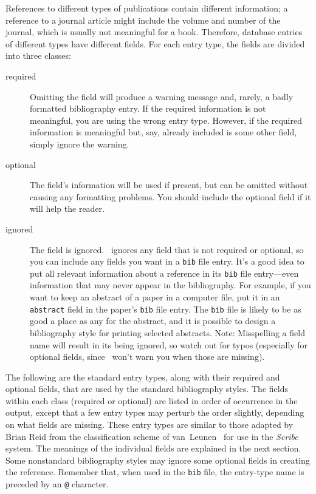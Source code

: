 References to different types of publications contain different
information; a reference to a journal article might include the volume
and number of the journal, which is usually not meaningful for a book.
Therefore, database entries of different types have different fields.
For each entry type, the fields are divided into three classes:
\begin{description}

\item[required]
Omitting the field will produce a warning message
and, rarely, a badly formatted bibliography entry.
If the required information is not meaningful,
you are using the wrong entry type.
However, if the required information is meaningful
but, say, already included is some other field,
simply ignore the warning.

\item[optional]
The field's information will be used if present,
but can be omitted without causing any formatting problems.
You should include the optional field if it will help the reader.

\item[ignored]
The field is ignored.
\BibTeX\ ignores any field that is not required or optional, so you can include
any fields you want in a \hbox{\tt bib} file entry.  It's a good idea
to put all relevant information about
a reference in its \hbox{\tt bib} file entry---even information that
may never appear in the bibliography.  For example, if you want to
keep an abstract of a paper in a computer file, put it in an \hbox{\tt
abstract} field in the paper's \hbox{\tt bib} file entry.  The
\hbox{\tt bib} file is likely to be as good a place as any for the
abstract, and it is possible to design a bibliography style for
printing selected abstracts.
Note: Misspelling a field name will
result in its being ignored,
so watch out for typos
(especially for optional fields,
since \BibTeX\ won't warn you when those are missing).

\end{description}

The following are the standard entry types, along with their required
and optional fields, that are used by the standard bibliography styles.
The fields within each class (required or optional)
are listed in order of occurrence in the output,
except that a few entry types may perturb the order slightly,
depending on what fields are missing.
These entry types are similar to those adapted by Brian Reid
from the classification scheme of van~Leunen~\cite{van-leunen}
for use in the {\em Scribe\/} system.
The meanings of the individual fields are explained in the next section.
Some nonstandard bibliography styles may ignore some optional fields
in creating the reference.
Remember that, when used in the \hbox{\tt bib}
file, the entry-type name is preceded by an \hbox{\tt @} character.

